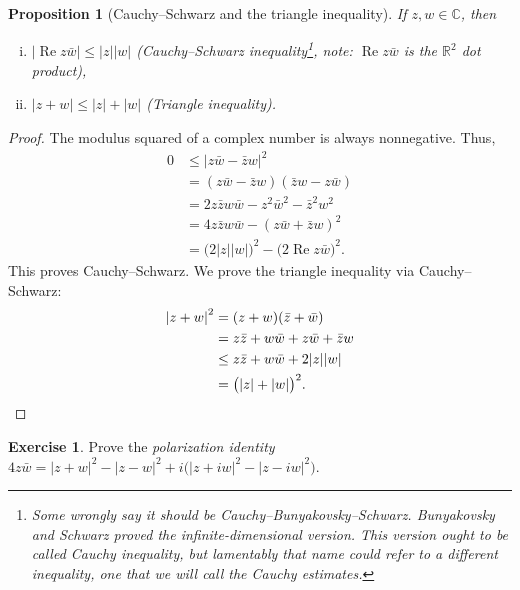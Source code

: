 \documentclass[12pt,openany]{book}
\renewcommand{\Re}{\operatorname{Re}}
\newcommand{\sabs}[1]{\lvert {#1} \rvert}
\newcommand{\C}{{\mathbb{C}}}
\newcommand{\R}{{\mathbb{R}}}
\newcommand{\myindex}[1]{#1\index{#1}}
\theoremstyle{plain}
\newtheorem{prop}[thm]{Proposition}
\theoremstyle{remark}
\theoremstyle{definition}
\newenvironment{exbox}{%
    \def\FrameCommand{\vrule width 1pt \relax\hspace{10pt}}%
    \MakeFramed{\advance\hsize-\width\FrameRestore}%
}{%
    \endMakeFramed
}
\theoremstyle{exercise}
\newtheorem{exercise}{Exercise}[section]
\theoremstyle{example}
\begin{document}
\begin{prop}[Cauchy--Schwarz and the triangle inequality]
If $z,w \in \C$, then
\begin{enumerate}[(i)]
\item
$\sabs{\Re z\bar{w}} \leq \sabs{z} \sabs{w}$ \quad (Cauchy--Schwarz inequality\footnote{%
Some wrongly say it should be Cauchy--Bunyakovsky--Schwarz.
Bunyakovsky and Schwarz proved the infinite-dimensional version.
This version ought to be called
Cauchy inequality, but lamentably that name could refer to a different
inequality, one that we will call the Cauchy estimates.}, note: $\Re z
\bar{w}$ is the $\R^2$ dot product),
\item
$\sabs{z+w} \leq \sabs{z} + \sabs{w}$ \quad (Triangle inequality).%
\end{enumerate}
\end{prop}

\begin{proof}
The modulus squared of a complex number is always nonnegative.
Thus,
\begin{equation*}
\begin{split}
0 & \leq {\sabs{z\bar{w}-\bar{z}w}}^2 \\
  & =    (z\bar{w}-\bar{z}w)(\bar{z}w-z\bar{w}) \\
  & =    2z\bar{z}w\bar{w} - z^2\bar{w}^2 - \bar{z}^2w^2 \\
  & =    4z\bar{z}w\bar{w} - {(z\bar{w}+\bar{z}w)}^2 \\
  & =    {\bigl(2\sabs{z}\sabs{w}\bigr)}^2 - {\bigl(2 \Re z\bar{w}\bigr)}^2 .
\end{split}
\end{equation*}
This proves Cauchy--Schwarz.  We prove the triangle inequality
via Cauchy--Schwarz:
\begin{equation*}
\begin{split}
{\sabs{z+w}}^2 & =    (z+w)(\bar{z}+\bar{w}) \\
               & =    z\bar{z} + w\bar{w} + z\bar{w} + \bar{z}w \\
               & \leq z\bar{z} + w\bar{w} + 2 \sabs{z}\sabs{w} \\
               & =    {\bigl(\sabs{z}+\sabs{w}\bigr)}^2 . \qedhere
\end{split}
\end{equation*}
\end{proof}

\begin{exbox}
\begin{exercise}
Prove the \emph{\myindex{polarization identity}}
$4 z\bar{w} =
{\sabs{z+w}}^2-{\sabs{z-w}}^2 +i \bigl( {\sabs{z+iw}}^2 - {\sabs{z-iw}}^2 \bigr)$.
\end{exercise}
\end{exbox}
\end{document}
